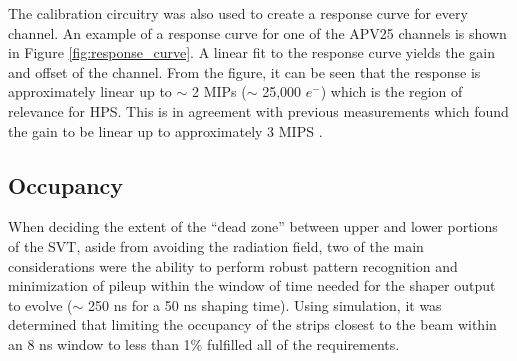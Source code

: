The calibration circuitry was also used to create a response
curve for every channel.  An example of a response curve for one of the 
APV25 channels is shown in Figure \ref{fig:response_curve}.  A linear fit
to the response curve yields the gain and offset of the channel. From the figure, 
it can be seen that the response is approximately linear up to $\sim$ 2 MIPs 
($\sim$ 25,000 $e^{-}$) which is the region of relevance for HPS.
This is in agreement with previous measurements which found the gain to be 
linear up to approximately 3 MIPS \cite{French:2001xb}.

\subsection{Occupancy}

When deciding the extent of the ``dead zone'' between upper and lower portions
of the SVT, aside from avoiding the radiation field, 
two of the main considerations were the ability to perform robust pattern 
recognition and minimization of pileup within the window of time needed for 
the shaper output to evolve ($\sim$ 250 ns for a 50 ns shaping time).  Using
simulation, it was determined that limiting the occupancy of the strips closest
to the beam within an 8 ns window to less than 1\% fulfilled all of the requirements. 

